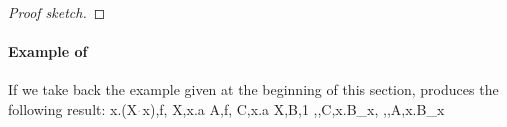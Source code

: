 \documentclass[sigconf,natbib=false,review]{acmart}
\newcommand{\appsep}{\ensuremath{\textcolor{lightgray}{\cdot}}}
\newcommand{\linkMacro}[1]{\ensuremath{#1}\texttt{-link}\xspace}
\newcommand{\linketa} {\linkMacro{\eta}}
\begin{document}
\begin{proof}[Proof sketch]
\end{proof}



\paragraph{Example of \mapdeduplication}
If we take back the example given at the beginning of this section,
\mapdeduplication produces the following result:
% 
\printAlll
  {{{\lambda x.(X\appsep x),f},
    {X,\lambda x.a}}}
  {{{A,f},
    {C,\lambda x.a}}}
  {{{X,B,1}}}
  {{{\eta,,C,\lambda x.B_{x}},
    {\eta,,A,\lambda x.B_{x}}}}
\end{document}
